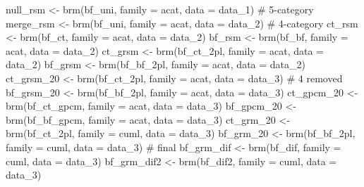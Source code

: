 \documentclass[
  man,
  floatsintext,
  longtable,
  nolmodern,
  notxfonts,
  notimes,
  colorlinks=true,linkcolor=blue,citecolor=blue,urlcolor=blue]{apa7}
\newenvironment{Shaded}{\begin{snugshade}}{\end{snugshade}}
\newcommand{\AttributeTok}[1]{\textcolor[rgb]{0.40,0.45,0.13}{#1}}
\newcommand{\CommentTok}[1]{\textcolor[rgb]{0.37,0.37,0.37}{#1}}
\newcommand{\FunctionTok}[1]{\textcolor[rgb]{0.28,0.35,0.67}{#1}}
\newcommand{\NormalTok}[1]{\textcolor[rgb]{0.00,0.23,0.31}{#1}}
\newcommand{\OtherTok}[1]{\textcolor[rgb]{0.00,0.23,0.31}{#1}}
\begin{document}
\begin{Shaded}
\begin{Highlighting}[]
\NormalTok{null\_rsm    }\OtherTok{\textless{}{-}} \FunctionTok{brm}\NormalTok{(bf\_uni,     }\AttributeTok{family =}\NormalTok{ acat, }\AttributeTok{data =}\NormalTok{ data\_1) }\CommentTok{\# 5{-}category}
\NormalTok{merge\_rsm   }\OtherTok{\textless{}{-}} \FunctionTok{brm}\NormalTok{(bf\_uni,     }\AttributeTok{family =}\NormalTok{ acat, }\AttributeTok{data =}\NormalTok{ data\_2) }\CommentTok{\# 4{-}category}
\NormalTok{ct\_rsm      }\OtherTok{\textless{}{-}} \FunctionTok{brm}\NormalTok{(bf\_ct,      }\AttributeTok{family =}\NormalTok{ acat, }\AttributeTok{data =}\NormalTok{ data\_2)}
\NormalTok{bf\_rsm      }\OtherTok{\textless{}{-}} \FunctionTok{brm}\NormalTok{(bf\_bf,      }\AttributeTok{family =}\NormalTok{ acat, }\AttributeTok{data =}\NormalTok{ data\_2)}
\NormalTok{ct\_grsm     }\OtherTok{\textless{}{-}} \FunctionTok{brm}\NormalTok{(bf\_ct\_2pl,  }\AttributeTok{family =}\NormalTok{ acat, }\AttributeTok{data =}\NormalTok{ data\_2)}
\NormalTok{bf\_grsm     }\OtherTok{\textless{}{-}} \FunctionTok{brm}\NormalTok{(bf\_bf\_2pl,  }\AttributeTok{family =}\NormalTok{ acat, }\AttributeTok{data =}\NormalTok{ data\_2)}
\NormalTok{ct\_grsm\_20  }\OtherTok{\textless{}{-}} \FunctionTok{brm}\NormalTok{(bf\_ct\_2pl,  }\AttributeTok{family =}\NormalTok{ acat, }\AttributeTok{data =}\NormalTok{ data\_3) }\CommentTok{\# 4 removed}
\NormalTok{bf\_grsm\_20  }\OtherTok{\textless{}{-}} \FunctionTok{brm}\NormalTok{(bf\_bf\_2pl,  }\AttributeTok{family =}\NormalTok{ acat, }\AttributeTok{data =}\NormalTok{ data\_3)}
\NormalTok{ct\_gpcm\_20  }\OtherTok{\textless{}{-}} \FunctionTok{brm}\NormalTok{(bf\_ct\_gpcm, }\AttributeTok{family =}\NormalTok{ acat, }\AttributeTok{data =}\NormalTok{ data\_3)}
\NormalTok{bf\_gpcm\_20  }\OtherTok{\textless{}{-}} \FunctionTok{brm}\NormalTok{(bf\_bf\_gpcm, }\AttributeTok{family =}\NormalTok{ acat, }\AttributeTok{data =}\NormalTok{ data\_3)}
\NormalTok{ct\_grm\_20   }\OtherTok{\textless{}{-}} \FunctionTok{brm}\NormalTok{(bf\_ct\_2pl,  }\AttributeTok{family =}\NormalTok{ cuml, }\AttributeTok{data =}\NormalTok{ data\_3)}
\NormalTok{bf\_grm\_20   }\OtherTok{\textless{}{-}} \FunctionTok{brm}\NormalTok{(bf\_bf\_2pl,  }\AttributeTok{family =}\NormalTok{ cuml, }\AttributeTok{data =}\NormalTok{ data\_3) }\CommentTok{\# final}
\NormalTok{bf\_grm\_dif  }\OtherTok{\textless{}{-}} \FunctionTok{brm}\NormalTok{(bf\_dif,     }\AttributeTok{family =}\NormalTok{ cuml, }\AttributeTok{data =}\NormalTok{ data\_3)}
\NormalTok{bf\_grm\_dif2 }\OtherTok{\textless{}{-}} \FunctionTok{brm}\NormalTok{(bf\_dif2,    }\AttributeTok{family =}\NormalTok{ cuml, }\AttributeTok{data =}\NormalTok{ data\_3)}
\end{Highlighting}
\end{Shaded}
\end{document}
